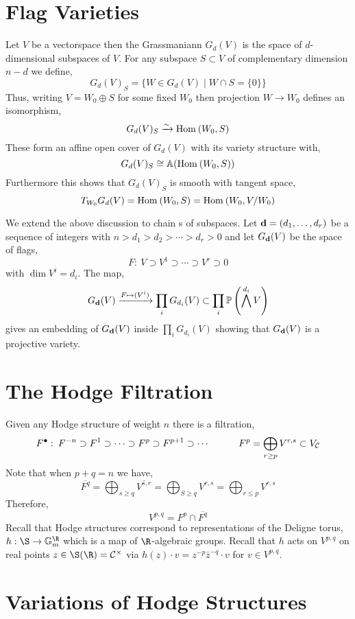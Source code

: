 \documentclass[12pt]{article}
\begin{document}
\section{Flag Varieties}

\begin{definition}
Let $V$ be a vectorspace then the Grassmaniann $G_d(V)$ is the space of $d$-dimensional subspaces of $V$. For any subspace $S \subset V$ of complementary dimension $n - d$ we define,
\[ G_d(V)_S = \{ W \in G_d(V) \mid W \cap S = \{ 0 \} \} \]
Thus, writing $V =  W_0 \oplus S$ for some fixed $W_0$ then projection $W \to W_0$ defines an isomorphism,
\[ G_d(V)_S \xrightarrow{\sim} \Hom{}{W_0}{S} \]
These form an affine open cover of $G_d(V)$ with its variety structure with, 
\[ G_d(V)_S \cong \A(\Hom{}{W_0}{S}) \]
Furthermore this shows that $G_d(V)_S$ is smooth with tangent space,
\[ T_{W_0} G_d(V) = \Hom{}{W_0}{S} = \Hom{}{W_0}{V/W_0} \] 
\end{definition}

\begin{definition}
We extend the above discussion to chain s of subspaces. Let $\bf{d} = (d_1, \dots, d_r)$ be a sequence of integers with $n > d_1 > d_2 > \cdots > d_r > 0$ and let $G_{\bf{d}}(V)$ be the space of flags,
\[ F : \: V \supset V^1 \supset \cdots \supset V^r \supset 0 \]
with $\dim{V^i} = d_i$. The map,
\[ G_{\bf{d}}(V) \xrightarrow{F \mapsto (V^i)} \prod_{i} G_{d_i}(V) \subset \prod_i \P\left( \bigwedge^{d_i} V \right) \]
gives an embedding of $G_{\bf{d}}(V)$ inside $\prod_i G_{d_i}(V)$ showing that $G_{\bf{d}}(V)$ is a projective variety.
\end{definition}

\section{The Hodge Filtration}

Given any Hodge structure of weight $n$ there is a filtration,
\[ F^\bullet : \: F^{-n} \supset F^1 \supset \cdots \supset F^p \supset F^{p+1} \supset \cdots \quad \quad \quad F^p = \bigoplus_{r \ge p} V^{r,s} \subset V_\C \]
Note that when $p + q = n$ we have,
\[ \overline{F^q} = \bigoplus_{s \ge q} \overline{V^{s,r}} = \bigoplus_{S \ge q} V^{r,s} = \bigoplus_{r \le p} V^{r,s} \]
Therefore,
\[ V^{p,q} = F^p \cap \overline{F^q} \]
Recall that Hodge structures correspond to representations of the Deligne torus, $h : \S \to \Gm^\R$ which is a map of $\R$-algebraic groups. Recall that $h$ acts on $V^{p,q}$ on real points $z \in \S(\R) = \C^\times$ via $h(z) \cdot v = z^{-p} \bar{z}^{-q} \cdot v$ for $v \in V^{p,q}$. 

\section{Variations of Hodge Structures}
\end{document}

